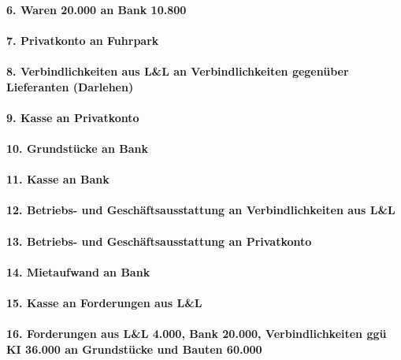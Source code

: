 \documentclass[paper=a4, fontsize=11pt]{scrartcl}
\numberwithin{equation}{section}
\numberwithin{figure}{section}
\numberwithin{table}{section}
\begin{document}
\paragraph{6. Waren 20.000 an Bank 10.800}

\paragraph{7. Privatkonto an Fuhrpark}

\paragraph{8. Verbindlichkeiten aus L&L an Verbindlichkeiten gegenüber Lieferanten (Darlehen)}

\paragraph{9. Kasse an Privatkonto}

\paragraph{10. Grundstücke an Bank}

\paragraph{11. Kasse an Bank}

\paragraph{12. Betriebs- und Geschäftsausstattung an Verbindlichkeiten aus L&L}

\paragraph{13. Betriebs- und Geschäftsausstattung an Privatkonto}

\paragraph{14. Mietaufwand an Bank}

\paragraph{15. Kasse an Forderungen aus L&L}

\paragraph{16. Forderungen aus L&L 4.000, Bank 20.000, Verbindlichkeiten ggü KI 36.000 an Grundstücke und Bauten 60.000}
\end{document}
